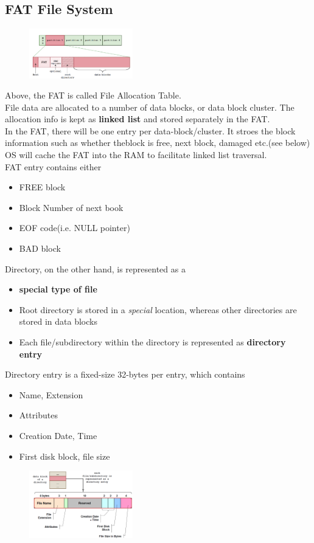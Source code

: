 \documentclass[12pt]{article}
\theoremstyle{definition}
\begin{document}
\subsection{FAT File System}
\begin{figure}[h]
\centering
\includegraphics[width=0.4\textwidth]{12_1.png}
\end{figure}
Above, the FAT is called File Allocation Table.\\
File data are allocated to a number of data blocks, or data block cluster. The allocation info is kept as \textbf{linked list} and stored separately in the FAT.\\
In the FAT, there will be one entry per data-block/cluster. It stroes the block information such as whether theblock is free, next block, damaged etc.(see below)\\
OS will cache the FAT into the RAM to facilitate linked list traversal.\\
FAT entry contains either
\begin{itemize}
  \item FREE block
  \item Block Number of next book
  \item EOF code(i.e. NULL pointer)
  \item BAD block
\end{itemize}
Directory, on the other hand, is represented as a 
\begin{itemize}
  \item \textbf{special type of file}
  \item Root directory is stored in a \textit{special} location, whereas other directories are stored in data blocks
  \item Each file/subdirectory within the directory is represented as \textbf{directory entry}
\end{itemize}
Directory entry is a fixed-size 32-bytes per entry, which contains
\begin{itemize}
  \item Name, Extension
  \item Attributes
  \item Creation Date, Time
  \item First disk block, file size
\end{itemize}
\begin{figure}[h]
\centering
\includegraphics[width=0.4\textwidth]{12_2.png}
\end{figure}
\end{document}
